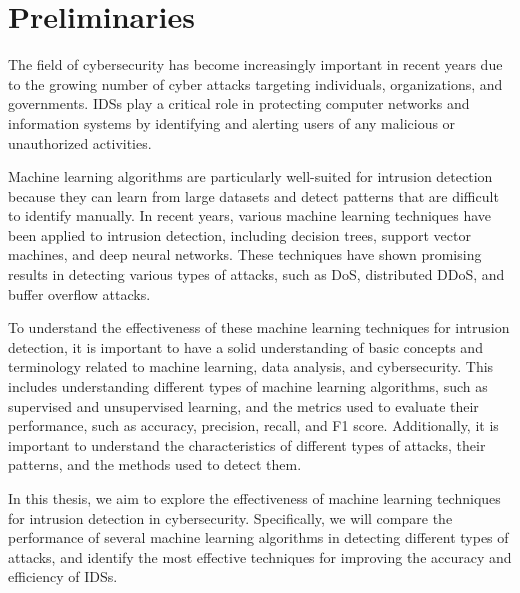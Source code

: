 \chapter{Preliminaries}

The field of cybersecurity has become increasingly important in recent years due to the growing number of cyber attacks targeting individuals, organizations, and governments. \Acp{IDS} play a critical role in protecting computer networks and information systems by identifying and alerting users of any malicious or unauthorized activities.

Machine learning algorithms are particularly well-suited for intrusion detection because they can learn from large datasets and detect patterns that are difficult to identify manually. In recent years, various machine learning techniques have been applied to intrusion detection, including decision trees, support vector machines, and deep neural networks. These techniques have shown promising results in detecting various types of attacks, such as \ac{DoS}, distributed \ac{DDoS}, and buffer overflow attacks.

To understand the effectiveness of these machine learning techniques for intrusion detection, it is important to have a solid understanding of basic concepts and terminology related to machine learning, data analysis, and cybersecurity. This includes understanding different types of machine learning algorithms, such as supervised and unsupervised learning, and the metrics used to evaluate their performance, such as accuracy, precision, recall, and F1 score. Additionally, it is important to understand the characteristics of different types of attacks, their patterns, and the methods used to detect them.

In this thesis, we aim to explore the effectiveness of machine learning techniques for intrusion detection in cybersecurity. Specifically, we will compare the performance of several machine learning algorithms in detecting different types of attacks, and identify the most effective techniques for improving the accuracy and efficiency of \acp{IDS}.
